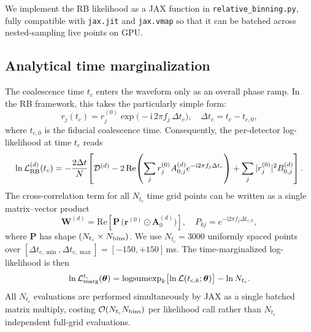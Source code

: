 \documentclass[twocolumn,superscriptaddress,nofootinbib,aps,prd]{revtex4-2}
\begin{document}
We implement the RB likelihood as a JAX function in
\texttt{relative\_binning.py}, fully compatible with \texttt{jax.jit} and
\texttt{jax.vmap} so that it can be batched across nested-sampling live points
on GPU.


\subsection{Analytical time marginalization}
\label{sec:time_marg}

The coalescence time $t_c$ enters the waveform only as an overall phase ramp.
In the RB framework, this takes the particularly simple form:
\begin{equation}
    r_j(t_c) = r_j^{(0)} \exp\!\bigl(-\mathrm{i}\, 2\pi f_j\,\Delta t_c\bigr),
    \quad \Delta t_c = t_c - t_{c,0},
\end{equation}
where $t_{c,0}$ is the fiducial coalescence time.  Consequently, the
per-detector log-likelihood at time $t_c$ reads
\begin{equation}
    \ln \mathcal{L}_{\rm RB}^{(d)}(t_c)
    = -\frac{2\Delta t}{N}\!\left[
        \mathcal{D}^{(d)}
        - 2\,\mathrm{Re}\!\left(
            \sum_j r_j^{(0)} A_{0,j}^{(d)}
            e^{-\mathrm{i}2\pi f_j \Delta t_c}
          \right)
        + \sum_j |r_j^{(0)}|^2 B_{0,j}^{(d)}
    \right].
\end{equation}
The cross-correlation term for all $N_{t_c}$ time grid points can be
written as a single matrix--vector product
\begin{equation}
    \mathbf{W}^{(d)} = \mathrm{Re}\!\left[
        \mathbf{P}\,\bigl(\mathbf{r}^{(0)} \odot \mathbf{A}_0^{(d)}\bigr)
    \right],
    \quad P_{kj} = e^{-\mathrm{i}2\pi f_j \Delta t_{c,k}},
\end{equation}
where $\mathbf{P}$ has shape $(N_{t_c} \times N_{\rm bins})$.  We use
$N_{t_c} = 3000$ uniformly spaced points over $[\Delta t_{c,\min},
\Delta t_{c,\max}] = [-150, +150]$\,ms.  The time-marginalized log-likelihood
is then
\begin{equation}
    \ln \mathcal{L}_{\rm marg}^{t_c}(\bm{\theta})
    = \mathrm{logsumexp}_k \bigl[\ln \mathcal{L}(t_{c,k};\bm{\theta})\bigr]
      - \ln N_{t_c}.
    \label{eq:time_marg}
\end{equation}
All $N_{t_c}$ evaluations are performed simultaneously by JAX as a single
batched matrix multiply, costing $\mathcal{O}(N_{t_c} N_{\rm bins})$ per
likelihood call rather than $N_{t_c}$ independent full-grid evaluations.
\end{document}
